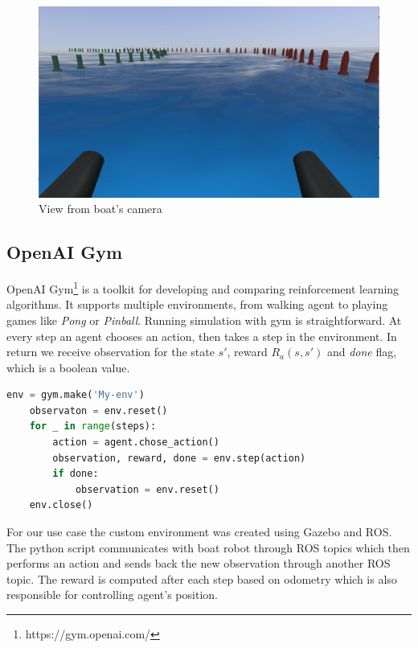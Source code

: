 \begin{figure}[h]
    \centering
    \includegraphics[width=16cm]{img/front_camera_image.png}
    \caption{View from boat's camera}
    \label{fig:camera-view}
\end{figure}

\subsection{OpenAI Gym}
\label{sub:openai-gym}

OpenAI Gym\footnote{https://gym.openai.com/} is a toolkit for developing and comparing reinforcement learning algorithms. It supports multiple environments, from walking agent to playing games like \emph{Pong} or \emph{Pinball}. Running simulation with gym is straightforward. At every step an agent chooses an action, then takes a step in the environment. In return we receive observation for the state $s'$, reward $R_a(s, s')$ and \emph{done} flag, which is a boolean value.

\begin{lstlisting}[language=Python, caption={Example gym environment simulation}, captionpos=b]
    env = gym.make('My-env')
    observaton = env.reset()
    for _ in range(steps):
        action = agent.chose_action()
        observation, reward, done = env.step(action)
        if done:
            observation = env.reset()
    env.close()
\end{lstlisting}

For our use case the custom environment was created using Gazebo and ROS. The python script communicates with boat robot through ROS topics which then performs an action and sends back the new observation through another ROS topic. The reward is computed after each step based on odometry which is also responsible for controlling agent's position.

